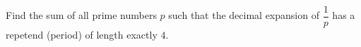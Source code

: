 Find the sum of all prime numbers $p$ such that the decimal expansion of $\dfrac{1}{p}$ has a repetend (period) of length exactly $4$.
